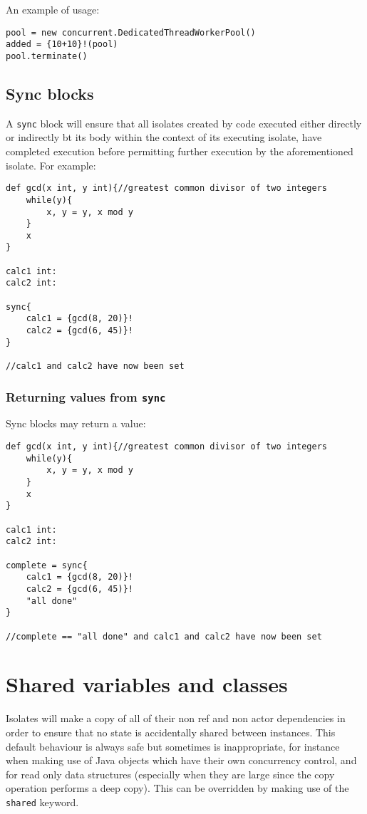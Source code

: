 \documentclass[conc-doc]{subfiles}
\begin{document}
An example of usage:

\begin{lstlisting}
pool = new concurrent.DedicatedThreadWorkerPool()
added = {10+10}!(pool)
pool.terminate()
\end{lstlisting}

\subsection{Sync blocks}
A \lstinline{sync} block will ensure that all isolates created by code executed either directly or indirectly bt its body within the context of its executing isolate, have completed execution before permitting further execution by the aforementioned isolate. For example:

\begin{lstlisting}
def gcd(x int, y int){//greatest common divisor of two integers
	while(y){
		x, y = y, x mod y
	}
	x
}

calc1 int:
calc2 int:

sync{
	calc1 = {gcd(8, 20)}!
	calc2 = {gcd(6, 45)}!
}

//calc1 and calc2 have now been set
\end{lstlisting}

\subsubsection{Returning values from \lstinline{sync}}
Sync blocks may return a value:

\begin{lstlisting}
def gcd(x int, y int){//greatest common divisor of two integers
	while(y){
		x, y = y, x mod y
	}
	x
}

calc1 int:
calc2 int:

complete = sync{
	calc1 = {gcd(8, 20)}!
	calc2 = {gcd(6, 45)}!
	"all done"
}

//complete == "all done" and calc1 and calc2 have now been set
\end{lstlisting}

\section{Shared variables and classes}
\label{sec:shared}
Isolates will make a copy of all of their non ref and non actor dependencies in order to ensure that no state is accidentally shared between instances. This default behaviour is always safe but sometimes is inappropriate, for instance when making use of Java objects which have their own concurrency control, and for read only data structures (especially when they are large since the copy operation performs a deep copy). This can be overridden by making use of the \lstinline{shared} keyword.
\end{document}
